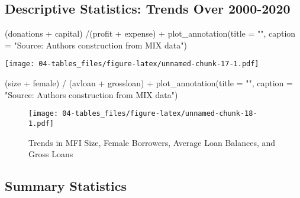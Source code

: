 \documentclass[a4paper,nobind]{templates/ociamthesis}
\newenvironment{Shaded}{\begin{snugshade}}{\end{snugshade}}
\newcommand{\AttributeTok}[1]{\textcolor[rgb]{0.77,0.63,0.00}{#1}}
\newcommand{\FunctionTok}[1]{\textcolor[rgb]{0.00,0.00,0.00}{#1}}
\newcommand{\NormalTok}[1]{#1}
\newcommand{\SpecialCharTok}[1]{\textcolor[rgb]{0.00,0.00,0.00}{#1}}
\newcommand{\StringTok}[1]{\textcolor[rgb]{0.31,0.60,0.02}{#1}}
\renewenvironment{Shaded}
{
  \vspace{10pt}%
  \begin{snugshade}%
}{%
  \end{snugshade}%
  \vspace{8pt}%
}
\begin{document}
\begin{landscape}
\newpage

\hypertarget{descriptive-statistics-trends-over-2000-2020}{%
\subsection{\texorpdfstring{\textbf{Descriptive Statistics: Trends Over 2000-2020}}{Descriptive Statistics: Trends Over 2000-2020}}\label{descriptive-statistics-trends-over-2000-2020}}

\begin{Shaded}
\begin{Highlighting}[]
\NormalTok{(donations }\SpecialCharTok{+}\NormalTok{ capital) }\SpecialCharTok{/}\NormalTok{(profit }\SpecialCharTok{+}\NormalTok{ expense) }\SpecialCharTok{+} \FunctionTok{plot\_annotation}\NormalTok{(}\AttributeTok{title =} \StringTok{""}\NormalTok{, }\AttributeTok{caption =} \StringTok{"Source: Authors\textquotesingle{} construction from MIX data"}\NormalTok{)}
\end{Highlighting}
\end{Shaded}

\texttt{[image: 04-tables\_files/figure-latex/unnamed-chunk-17-1.pdf]}

\newpage

\begin{Shaded}
\begin{Highlighting}[]
\NormalTok{(size }\SpecialCharTok{+}\NormalTok{ female) }\SpecialCharTok{/}\NormalTok{ (avloan }\SpecialCharTok{+}\NormalTok{ grossloan) }\SpecialCharTok{+} \FunctionTok{plot\_annotation}\NormalTok{(}\AttributeTok{title =} \StringTok{""}\NormalTok{, }\AttributeTok{caption =} \StringTok{"Source: Authors\textquotesingle{} construction from MIX data"}\NormalTok{)}
\end{Highlighting}
\end{Shaded}

\begin{figure}
\centering
\texttt{[image: 04-tables\_files/figure-latex/unnamed-chunk-18-1.pdf]}
\caption{\label{fig:unnamed-chunk-18}Trends in MFI Size, Female Borrowers, Average Loan Balances, and Gross Loans}
\end{figure}

\end{landscape}

\hypertarget{summary-statistics}{%
\subsection{Summary Statistics}\label{summary-statistics}}
\end{document}
